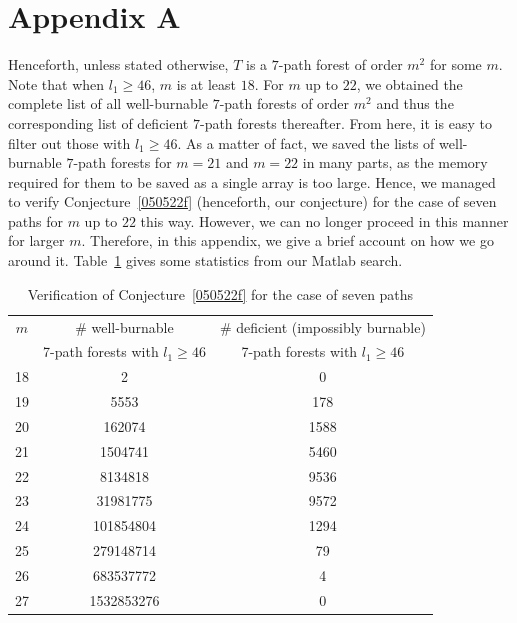\documentclass[
final
]{dmtcs-episciences}
\theoremstyle{definition}
\theoremstyle{remark}
\begin{document}
%
%
%


\section*{Appendix A}\label{appendix A}


Henceforth, unless stated otherwise, $T$ is a $7$-path forest of order $m^2$ for some $m$. Note that when $l_1\geq 46$, $m$ is at least $18$. For $m$ up to $22$, we obtained the complete list of all well-burnable $7$-path forests of order $m^2$ and thus the corresponding list of deficient $7$-path forests thereafter. From here, it is easy to filter out those with $l_1\geq 46$. As a matter of fact, we saved the lists of well-burnable $7$-path forests for $m=21$ and $m=22$ in many parts, as the memory required for them to be saved as a single array is too large. Hence, we managed to verify Conjecture~\ref{050522f} (henceforth, our conjecture) for the case of seven paths for $m$ up to $22$ this way. However, we can no longer proceed in this manner for larger $m$. Therefore, in this appendix, we give a brief account on how we go around it. Table~\ref{151017b} gives some statistics from our Matlab search.


\begin{table}[h]
	\begin{center}
		\begin{tabular}{ | c | c | c| }
			\hline
			$m$ & \# well-burnable & \# deficient (impossibly burnable) \\
			&	 7-path forests with $l_1\geq 46$ & 7-path forests with $l_1\geq 46$
			\\ \hline
			18 & 2  & 0       \\ \hline
			19 & 5553 &178 \\ \hline
			20 & 162074 &1588\\ \hline
			21 & 1504741 &5460\\ \hline
			22 & 8134818 &9536\\ \hline
			23 &  31981775 & 9572\\ \hline
			24 & 101854804 &1294  \\ \hline
			25 & 279148714 & 79\\ \hline
			26 & 683537772  &  4  \\ \hline
			27 &  1532853276 &   0\\ \hline
		\end{tabular}
		\vspace{2mm}
		\caption{Verification of Conjecture~\ref{050522f} for the case of seven paths}\label{151017b}
	\end{center}
\end{table}
\end{document}
